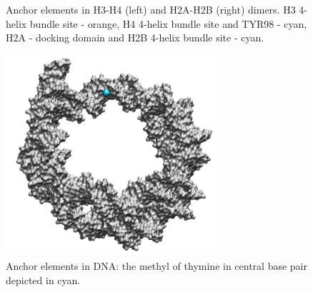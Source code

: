 \documentclass[12pt,onecolumn]{scrartcl}
\begin{document}
\begin{figure}[h]
\begin{center}
\caption{Anchor elements in H3-H4 (left) and H2A-H2B (right) dimers. H3 4-helix bundle site - orange, H4 4-helix bundle site and TYR98 - cyan, H2A - docking domain and H2B 4-helix bundle site - cyan.}
\label{dim_elem}
\end{center}
\end{figure}

\begin{figure}[h]
\begin{center}
\includegraphics[width=0.7\textwidth]{img/dna} 
\caption{Anchor elements in DNA: the methyl of thymine in central base pair depicted in cyan.}
\label{dna}
\end{center}
\end{figure}
\end{document}
